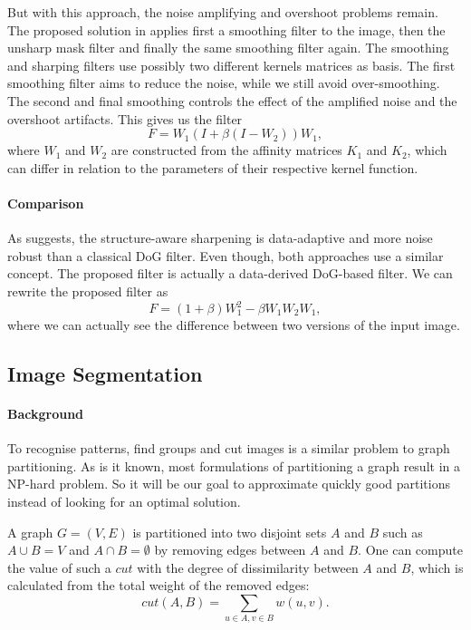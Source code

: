 But with this approach, the noise amplifying and overshoot problems remain.
The proposed solution in \cite{kheradmand_non-linear_2015} applies first a smoothing filter to the image, then the unsharp mask filter and finally the same smoothing filter again.
The smoothing and sharping filters use possibly two different kernels matrices as basis.
The first smoothing filter aims to reduce the noise, while we still avoid over-smoothing.
The second and final smoothing controls the effect of the amplified noise and the overshoot artifacts.
This gives us the filter
\[F = W_1(I + \beta (I - W_2))W_1,\]
where \(W_1\) and \(W_2\) are constructed from the affinity matrices \(K_1\) and \(K_2\), which can differ in relation to the parameters of their respective kernel function.

\paragraph{Comparison}

As \cite{kheradmand_non-linear_2015} suggests, the structure-aware sharpening is data-adaptive and more noise robust than a classical DoG filter.
Even though, both approaches use a similar concept.
The proposed filter is actually a data-derived DoG-based filter.
We can rewrite the proposed filter as
\[F = (1+\beta) W_1^2 - \beta W_1 W_2 W_1,\]
where we can actually see the difference between two versions of the input image.

\subsection{Image Segmentation}

\paragraph{Background}

To recognise patterns, find groups and cut images is a similar problem to graph partitioning.
As is it known, most formulations of partitioning a graph result in a NP-hard problem.
So it will be our goal to approximate quickly good partitions instead of looking for an optimal solution.

A graph \(G = (V, E)\) is partitioned into two disjoint sets \(A\) and \(B\) such as \(A \cup B = V\) and \(A \cap B = \emptyset\) by removing edges between \(A\) and \(B\).
One can compute the value of such a \(cut\) with the degree of dissimilarity between \(A\) and \(B\), which is calculated from the total weight of the removed edges:
\[cut(A, B) = \sum_{u\in A, v\in B} w(u, v).\]

